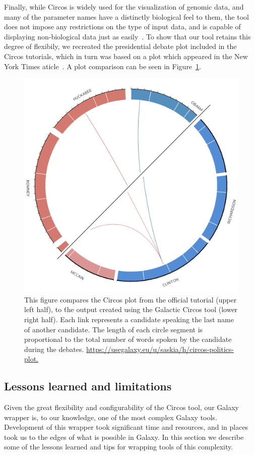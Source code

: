 Finally, while Circos is widely used for the visualization of genomic data, and many of the parameter names have a distinctly biological feel to them, the tool does not impose any restrictions on the type of input data, and is capable of displaying non-biological data just as easily~\cite{circosnongenomic}. To show that our tool retains this degree of flexibily, we recreated the presidential debate plot included in the Circos tutorials, which in turn was based on a plot which appeared in the New York Times aticle~\cite{namingnames}. A plot comparison can be seen in Figure~\ref{figure:debate}.

\begin{figure}[h!]
\centering
\includegraphics[width=0.6\linewidth]{chapters/images/circos/plot-politics-both.png}
\caption{This figure compares the Circos plot from the official tutorial (upper left half), to ťhe output created using the Galactic Circos tool (lower right half). Each link represents a candidate speaking the last name of another candidate. The length of each circle segment is proportional to the total number of words spoken by the candidate during the debates. \url{ https://usegalaxy.eu/u/saskia/h/circos-politics-plot.}}
\label{figure:debate}
\end{figure}


\subsection*{Lessons learned and limitations}

Given the great flexibility and configurability of the Circos tool, our Galaxy wrapper is, to our knowledge, one of the most complex Galaxy tools. Development of this wrapper took significant time and resources, and in places took us to the edges of what is possible in Galaxy. In this section we describe some of the lessons learned and tips for wrapping tools of this complexity.

